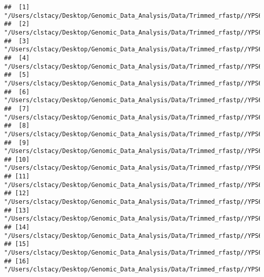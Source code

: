 \documentclass[
]{book}
\newenvironment{Shaded}{\begin{snugshade}}{\end{snugshade}}
\newcommand{\AttributeTok}[1]{\textcolor[rgb]{0.13,0.29,0.53}{#1}}
\newcommand{\CommentTok}[1]{\textcolor[rgb]{0.56,0.35,0.01}{\textit{#1}}}
\newcommand{\ConstantTok}[1]{\textcolor[rgb]{0.56,0.35,0.01}{#1}}
\newcommand{\FunctionTok}[1]{\textcolor[rgb]{0.13,0.29,0.53}{\textbf{#1}}}
\newcommand{\NormalTok}[1]{#1}
\newcommand{\OtherTok}[1]{\textcolor[rgb]{0.56,0.35,0.01}{#1}}
\newcommand{\StringTok}[1]{\textcolor[rgb]{0.31,0.60,0.02}{#1}}
\begin{document}
\begin{Shaded}
\end{Shaded}

\begin{verbatim}
##  [1] "/Users/clstacy/Desktop/Genomic_Data_Analysis/Data/Trimmed_rfastp//YPS606_MSN24_ETOH_REP1_R1.fastq.gz.subread.BAM"
##  [2] "/Users/clstacy/Desktop/Genomic_Data_Analysis/Data/Trimmed_rfastp//YPS606_MSN24_ETOH_REP2_R1.fastq.gz.subread.BAM"
##  [3] "/Users/clstacy/Desktop/Genomic_Data_Analysis/Data/Trimmed_rfastp//YPS606_MSN24_ETOH_REP3_R1.fastq.gz.subread.BAM"
##  [4] "/Users/clstacy/Desktop/Genomic_Data_Analysis/Data/Trimmed_rfastp//YPS606_MSN24_ETOH_REP4_R1.fastq.gz.subread.BAM"
##  [5] "/Users/clstacy/Desktop/Genomic_Data_Analysis/Data/Trimmed_rfastp//YPS606_MSN24_MOCK_REP1_R1.fastq.gz.subread.BAM"
##  [6] "/Users/clstacy/Desktop/Genomic_Data_Analysis/Data/Trimmed_rfastp//YPS606_MSN24_MOCK_REP2_R1.fastq.gz.subread.BAM"
##  [7] "/Users/clstacy/Desktop/Genomic_Data_Analysis/Data/Trimmed_rfastp//YPS606_MSN24_MOCK_REP3_R1.fastq.gz.subread.BAM"
##  [8] "/Users/clstacy/Desktop/Genomic_Data_Analysis/Data/Trimmed_rfastp//YPS606_MSN24_MOCK_REP4_R1.fastq.gz.subread.BAM"
##  [9] "/Users/clstacy/Desktop/Genomic_Data_Analysis/Data/Trimmed_rfastp//YPS606_WT_ETOH_REP1_R1.fastq.gz.subread.BAM"   
## [10] "/Users/clstacy/Desktop/Genomic_Data_Analysis/Data/Trimmed_rfastp//YPS606_WT_ETOH_REP2_R1.fastq.gz.subread.BAM"   
## [11] "/Users/clstacy/Desktop/Genomic_Data_Analysis/Data/Trimmed_rfastp//YPS606_WT_ETOH_REP3_R1.fastq.gz.subread.BAM"   
## [12] "/Users/clstacy/Desktop/Genomic_Data_Analysis/Data/Trimmed_rfastp//YPS606_WT_ETOH_REP4_R1.fastq.gz.subread.BAM"   
## [13] "/Users/clstacy/Desktop/Genomic_Data_Analysis/Data/Trimmed_rfastp//YPS606_WT_MOCK_REP1_R1.fastq.gz.subread.BAM"   
## [14] "/Users/clstacy/Desktop/Genomic_Data_Analysis/Data/Trimmed_rfastp//YPS606_WT_MOCK_REP2_R1.fastq.gz.subread.BAM"   
## [15] "/Users/clstacy/Desktop/Genomic_Data_Analysis/Data/Trimmed_rfastp//YPS606_WT_MOCK_REP3_R1.fastq.gz.subread.BAM"   
## [16] "/Users/clstacy/Desktop/Genomic_Data_Analysis/Data/Trimmed_rfastp//YPS606_WT_MOCK_REP4_R1.fastq.gz.subread.BAM"
\end{verbatim}
\end{document}
